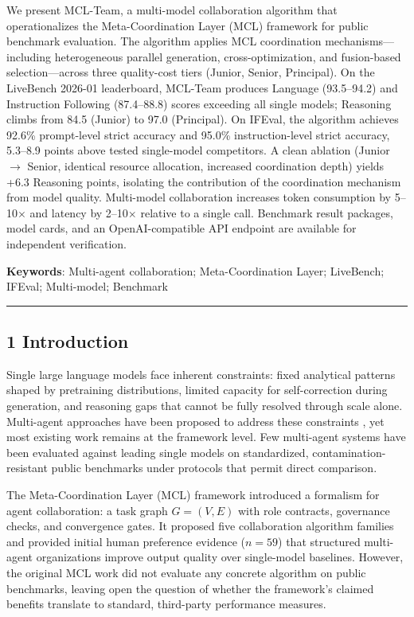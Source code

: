 \documentclass[
]{article}
\begin{document}
We present MCL-Team, a multi-model collaboration algorithm that operationalizes the Meta-Coordination Layer (MCL) framework \cite{Zhang2025MCL} for public benchmark evaluation. The algorithm applies MCL coordination mechanisms---including heterogeneous parallel generation, cross-optimization, and fusion-based selection---across three quality-cost tiers (Junior, Senior, Principal). On the LiveBench 2026-01 leaderboard, MCL-Team produces Language (93.5--94.2) and Instruction Following (87.4--88.8) scores exceeding all single models; Reasoning climbs from 84.5 (Junior) to 97.0 (Principal). On IFEval, the algorithm achieves 92.6\% prompt-level strict accuracy and 95.0\% instruction-level strict accuracy, 5.3--8.9 points above tested single-model competitors. A clean ablation (Junior $\rightarrow$ Senior, identical resource allocation, increased coordination depth) yields +6.3 Reasoning points, isolating the contribution of the coordination mechanism from model quality. Multi-model collaboration increases token consumption by 5--10$\times$ and latency by 2--10$\times$ relative to a single call. Benchmark result packages, model cards, and an OpenAI-compatible API endpoint are available for independent verification.

\textbf{Keywords}: Multi-agent collaboration; Meta-Coordination Layer; LiveBench; IFEval; Multi-model; Benchmark

\begin{center}\rule{0.5\linewidth}{0.5pt}\end{center}

\subsection{1 Introduction}\label{introduction}

Single large language models face inherent constraints: fixed analytical patterns shaped by pretraining distributions, limited capacity for self-correction during generation, and reasoning gaps that cannot be fully resolved through scale alone. Multi-agent approaches have been proposed to address these constraints \cite{Hong2023MetaGPT,Li2023CAMEL,Wu2023AutoGen}, yet most existing work remains at the framework level. Few multi-agent systems have been evaluated against leading single models on standardized, contamination-resistant public benchmarks under protocols that permit direct comparison.

The Meta-Coordination Layer (MCL) framework \cite{Zhang2025MCL} introduced a formalism for agent collaboration: a task graph \(G=(V,E)\) with role contracts, governance checks, and convergence gates. It proposed five collaboration algorithm families and provided initial human preference evidence (\(n=59\)) that structured multi-agent organizations improve output quality over single-model baselines. However, the original MCL work did not evaluate any concrete algorithm on public benchmarks, leaving open the question of whether the framework's claimed benefits translate to standard, third-party performance measures.
\end{document}
